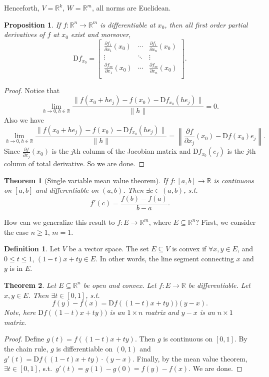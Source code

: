 \documentclass[12pt]{article}
\theoremstyle{plain}
\newtheorem{thm}{Theorem}
\newtheorem*{prop}{Proposition}
\theoremstyle{definition}
\newtheorem*{defn}{Definition}
\begin{document}
Henceforth, $V=\mathbb{R}^k$, $W=\mathbb{R}^m$, all norms are Euclidean.
\begin{prop}
    If $f: \mathbb{R}^n \rightarrow \mathbb{R}^m$ is differentiable at $x_0$, then all first order partial derivatives of $f$ at $x_0$ exist and
    moreover,
    \[
        \mathrm{D}f_{x_0} = 
        \begin{bmatrix}
            \frac{\partial f_1}{\partial x_1}(x_0) & \cdots &\frac{\partial f_1}{\partial x_n}(x_0)\\
                \vdots&\ddots&\vdots\\
            \frac{\partial f_m}{\partial x_1}(x_0) & \cdots &\frac{\partial f_m}{\partial x_n}(x_0)\\
        \end{bmatrix}.
    \]
\end{prop}
\begin{proof}
    Notice that
    \[
        \lim_{h\rightarrow 0, h\in\mathbb{R}} \frac{\|f(x_0+he_j) - f(x_0) - \mathrm{D}f_{x_0}(he_j)\|}{\|h\|} = 0.
    \]
    Also we have
    \[
        \lim_{h\rightarrow 0, h\in\mathbb{R}} \frac{\|f(x_0+he_j) - f(x_0) - \mathrm{D}f_{x_0}(he_j)\|}{\|h\|} 
        = \left\|\frac{\partial f}{\partial x_j}(x_0) - \mathrm{D}f(x_0)e_j\right\|.
    \]
    Since $\frac{\partial f}{\partial x_j}(x_0)$ is the $j$th column of the Jacobian matrix and $\mathrm{D}f_{x_0}(e_j)$ is the $j$th column of total derivative.
    So we are done.
\end{proof}

\begin{thm}[Single variable mean value theorem]
    If $f:[a,b]\rightarrow\mathbb{R}$ is continuous on $[a,b]$ and differentiable on $(a,b)$.
        Then $\exists c\in(a,b)$, s.t.
        \[
            f'(c) = \frac{f(b)-f(a)}{b-a}.
        \]
\end{thm}
How can we generalize this result to $f: E\rightarrow\mathbb{R}^m$, where $E\subseteq \mathbb{R}^n$?
First, we consider the case $n\geq 1$, $m=1$.

\begin{defn}
    Let $V$ be a vector space. The set $E\subseteq V$ is convex if $\forall x,y\in E$, and $0\leq t\leq 1$, $(1-t)x+ty\in E$.
    In other words, the line segment connecting $x$ and $y$ is in $E$.
\end{defn}

\begin{thm}
    Let $E\subseteq \mathbb{R}^n$ be open and convex.
    Let $f: E\rightarrow \mathbb{R}$ be differentiable.
    Let $x, y\in E$.
    Then $\exists t\in[0,1]$, s.t.\ 
    \[
        f(y) - f(x) = \mathrm{D}f((1-t)x+ty))(y-x).
    \]
    Note, here $\mathrm{D}f((1-t)x+ty))$ is an $1\times n$ matrix and $y-x$ is an $n\times 1$ matrix.
\end{thm}
\begin{proof}
    Define $g(t) = f((1-t)x+ty)$.
    Then $g$ is continuous on $[0,1]$.
    By the chain rule, $g$ is differentiable on $(0,1)$ and $g'(t) = \mathrm{D}f((1-t)x + ty)\cdot(y-x)$.
    Finally, by the mean value theorem, $\exists t\in[0,1]$, s.t.\
    $g'(t) = g(1) - g(0) = f(y)-f(x)$.
    We are done.
\end{proof}
\end{document}
